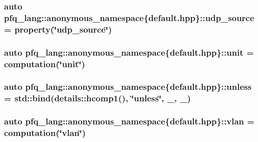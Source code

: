 \hypertarget{namespacepfq__lang_1_1anonymous__namespace_02default_8hpp_03_a7d2943522cfb795fcb82c894dba83292}{
\subsubsection[{udp\-\_\-source}]{\setlength{\rightskip}{0pt plus 5cm}auto pfq\-\_\-lang\-::anonymous\-\_\-namespace\{default.\-hpp\}\-::udp\-\_\-source = {\bf property}(\char`\"{}udp\-\_\-source\char`\"{})}}\label{namespacepfq__lang_1_1anonymous__namespace_02default_8hpp_03_a7d2943522cfb795fcb82c894dba83292}
\hypertarget{namespacepfq__lang_1_1anonymous__namespace_02default_8hpp_03_ae78caafebdc64f9180032a049b7c3b3a}{
\subsubsection[{unit}]{\setlength{\rightskip}{0pt plus 5cm}auto pfq\-\_\-lang\-::anonymous\-\_\-namespace\{default.\-hpp\}\-::unit = {\bf computation}(\char`\"{}unit\char`\"{})}}\label{namespacepfq__lang_1_1anonymous__namespace_02default_8hpp_03_ae78caafebdc64f9180032a049b7c3b3a}
\hypertarget{namespacepfq__lang_1_1anonymous__namespace_02default_8hpp_03_af01f3831a7b0294b6ffef87a09b481d7}{
\subsubsection[{unless}]{\setlength{\rightskip}{0pt plus 5cm}auto pfq\-\_\-lang\-::anonymous\-\_\-namespace\{default.\-hpp\}\-::unless = std\-::bind(details\-::hcomp1(), \char`\"{}unless\char`\"{}, \-\_, \-\_)}}\label{namespacepfq__lang_1_1anonymous__namespace_02default_8hpp_03_af01f3831a7b0294b6ffef87a09b481d7}
\hypertarget{namespacepfq__lang_1_1anonymous__namespace_02default_8hpp_03_a78f5b5ec52d0563083f1e41d746843f6}{
\subsubsection[{vlan}]{\setlength{\rightskip}{0pt plus 5cm}auto pfq\-\_\-lang\-::anonymous\-\_\-namespace\{default.\-hpp\}\-::vlan = {\bf computation}(\char`\"{}vlan\char`\"{})}}\label{namespacepfq__lang_1_1anonymous__namespace_02default_8hpp_03_a78f5b5ec52d0563083f1e41d746843f6}
